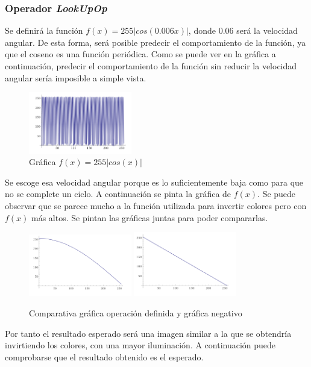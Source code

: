 \subsubsection{Operador \textit{LookUpOp}}
Se definirá la función $f(x) = 255|cos(0.006x)|$, donde $0.06$ será la velocidad angular. De esta forma, será posible predecir el comportamiento de la función, ya que el coseno es una función periódica. Como se puede ver en la gráfica a continuación, predecir el comportamiento de la función sin reducir la velocidad angular sería imposible a simple vista.
\vskip0.3cm
\begin{figure}[H]
 \centering
  \includegraphics[width=0.4\textwidth]{imagenes/graficaCoseno2.png}
 \caption{Gráfica $f(x) = 255|cos(x)|$}
 \label{diseño}
 \end{figure}
Se escoge esa velocidad angular porque es lo suficientemente baja como para que no se complete un ciclo. A continuación se pinta la gráfica de $f(x)$. Se puede observar que se parece mucho a la función utilizada para invertir colores pero con $f(x)$ más altos. Se pintan las gráficas juntas para poder compararlas.
\vskip0.3cm
\begin{figure}[H]
 \centering
  \includegraphics[width=0.4\textwidth]{imagenes/graficaCoseno.png}
  \includegraphics[width=0.4\textwidth]{imagenes/graficaNegativo.png}
 \caption{Comparativa gráfica operación definida y gráfica negativo}
 \label{diseño}
 \end{figure}
 Por tanto el resultado esperado será una imagen similar a la que se obtendría invirtiendo los colores, con una mayor iluminación. A continuación puede comprobarse que el resultado obtenido es el esperado.
